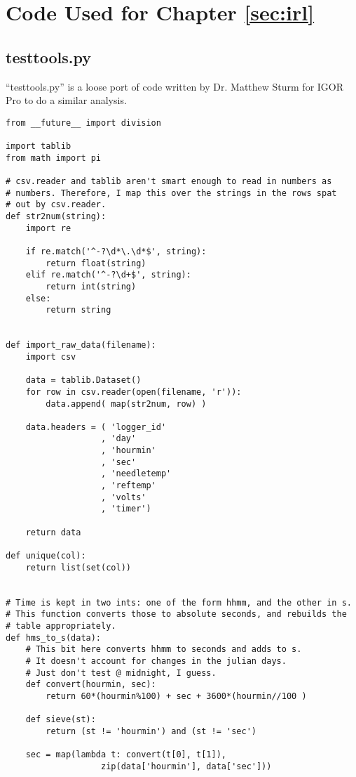 \chapter{Code Used for Chapter \ref{sec:irl}}
\label{apx:irl}

\section{testtools.py}

``testtools.py'' is a loose port of code written by Dr. Matthew Sturm for
IGOR Pro to do a similar analysis.

\small
\begin{verbatim}
from __future__ import division

import tablib
from math import pi

# csv.reader and tablib aren't smart enough to read in numbers as 
# numbers. Therefore, I map this over the strings in the rows spat
# out by csv.reader.
def str2num(string):
    import re

    if re.match('^-?\d*\.\d*$', string):
        return float(string)
    elif re.match('^-?\d+$', string):
        return int(string)
    else:
        return string


def import_raw_data(filename):
    import csv

    data = tablib.Dataset()
    for row in csv.reader(open(filename, 'r')):
        data.append( map(str2num, row) )

    data.headers = ( 'logger_id'
                   , 'day'
                   , 'hourmin'
                   , 'sec'
                   , 'needletemp'
                   , 'reftemp'
                   , 'volts'
                   , 'timer')

    return data

def unique(col):
    return list(set(col))


# Time is kept in two ints: one of the form hhmm, and the other in s.
# This function converts those to absolute seconds, and rebuilds the
# table appropriately.
def hms_to_s(data):
    # This bit here converts hhmm to seconds and adds to s.
    # It doesn't account for changes in the julian days.
    # Just don't test @ midnight, I guess.
    def convert(hourmin, sec):
        return 60*(hourmin%100) + sec + 3600*(hourmin//100 )

    def sieve(st):
        return (st != 'hourmin') and (st != 'sec')

    sec = map(lambda t: convert(t[0], t[1]), 
                   zip(data['hourmin'], data['sec']))


\end{verbatim}
